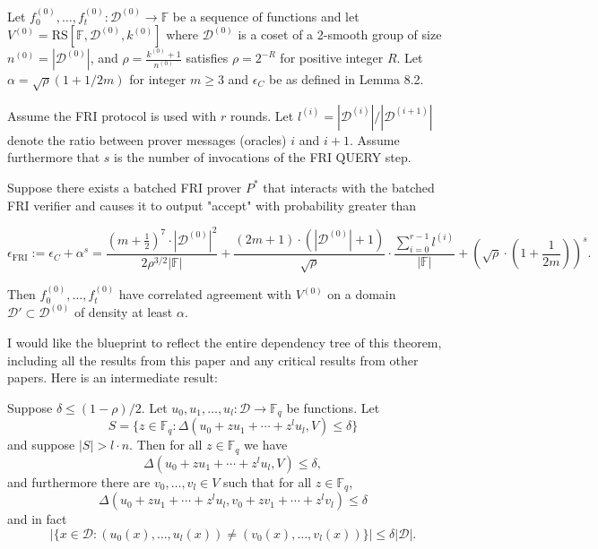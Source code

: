 \begin{theorem}[8.3] \label{Batched FRI Soundness}
  Let $f_0^{(0)},\ldots,f_t^{(0)} : \mathcal{D}^{(0)} \to \mathbb{F}$ be a sequence of functions
  and let $V^{(0)} = \mathrm{RS}[\mathbb{F},\mathcal{D}^{(0)},k^{(0)}]$ where $\mathcal{D}^{(0)}$ is a coset of a 2-smooth group of size $n^{(0)} = |\mathcal{D}^{(0)}|$, and
  $\rho = \frac{k^{(0)}+1}{n^{(0)}}$ satisfies $\rho = 2^{-R}$ for positive integer $R$. Let $\alpha = \sqrt{\rho}(1+1/2m)$ for integer $m \geq 3$ and $\epsilon_C$
  be as defined in Lemma 8.2.

  Assume the FRI protocol is used with $r$ rounds. Let $l^{(i)} = |\mathcal{D}^{(i)}|/|\mathcal{D}^{(i+1)}|$ denote the ratio between
  prover messages (oracles) $i$ and $i+1$. Assume furthermore that $s$ is the number of invocations of
  the FRI QUERY step.

  Suppose there exists a batched FRI prover $P^*$ that interacts with the batched FRI verifier and
  causes it to output "accept" with probability greater than

  \[\epsilon_{\mathrm{FRI}} := \epsilon_C + \alpha^s = \frac{\left(m+\frac{1}{2}\right)^7 \cdot |\mathcal{D}^{(0)}|^2}{2\rho^{3/2}|\mathbb{F}|} + \frac{(2m+1) \cdot (|\mathcal{D}^{(0)}|+1)}{\sqrt{\rho}} \cdot \frac{\sum_{i=0}^{r-1} l^{(i)}}{|\mathbb{F}|} + \left(\sqrt{\rho} \cdot \left(1+\frac{1}{2m}\right)\right)^s.\]

  Then $f_0^{(0)},\ldots,f_t^{(0)}$ have correlated agreement with $V^{(0)}$ on a domain $\mathcal{D}' \subset \mathcal{D}^{(0)}$ of density at
  least $\alpha$.
\end{theorem}

I would like the blueprint to reflect the entire dependency tree of this theorem, including all the results from this paper and any critical results from other papers. Here is an intermediate result:

\begin{theorem}[6.1]
  Suppose $\delta \leq (1-\rho)/2$. Let $u_0, u_1, \ldots, u_l : \mathcal{D} \to \mathbb{F}_q$ be functions. Let
  \[
  S = \{z \in \mathbb{F}_q : \Delta(u_0 + zu_1 + \cdots + z^lu_l, V) \leq \delta\}
  \]
  and suppose $|S| > l \cdot n$. Then for all $z \in \mathbb{F}_q$ we have
  \[
  \Delta(u_0 + zu_1 + \cdots + z^lu_l, V) \leq \delta,
  \]
  and furthermore there are $v_0, \ldots, v_l \in V$ such that for all $z \in \mathbb{F}_q$,
  \[
  \Delta(u_0 + zu_1 + \cdots + z^lu_l, v_0 + zv_1 + \cdots + z^lv_l) \leq \delta
  \]
  and in fact
  \[
  |\{x \in \mathcal{D} : (u_0(x), \ldots, u_l(x)) \neq (v_0(x), \ldots, v_l(x))\}| \leq \delta|\mathcal{D}|.
  \]
\end{theorem}
